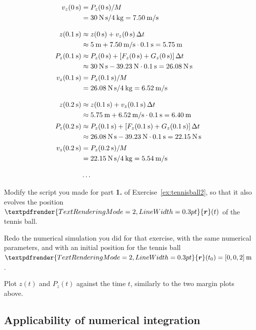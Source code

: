 \documentclass[a4paper,12pt,%
onecolumn,oneside,titlepage,%
british%
]{memoir}
\renewcommand*{\bm}[1]{\textpdfrender{TextRenderingMode=2,LineWidth=0.3pt}{\boldsymbol{#1}}}
\newcommand*{\incr}{\Delta}%
\renewcommand*{\|}[1][]{\nonscript\:#1\vert\nonscript\:\mathopen{}}
\newcommand*{\yr}{\bm{r}}
\newcommand*{\yM}{M}%
\newcommand*{\Dt}{\incr t}
\begin{document}
\begin{equation*}
  \begin{aligned}
    v_{z}(\qty{0}{s}) &= P_{z}(\qty{0}{s})/\yM\\
    &=\qty{30}{N\,s}/\qty{4}{kg} = \qty{7.50}{m/s}
    \\[3\jot]
    z(\qty{0.1}{s})  &\approx z(\qty{0}{s}) + v_{z}(\qty{0}{s})\,\Dt\\
    &\approx \qty{5}{m} + \qty{7.50}{m/s}\cdot\qty{0.1}{s} = \qty{5.75}{m}\\[0.5\jot]
    P_{z}(\qty{0.1}{s})  &\approx P_{z}(\qty{0}{s}) + [F_{z}(\qty{0}{s}) + G_{z}(\qty{0}{s})]\,\Dt \\
    &\approx\qty{30}{N\,s} -\qty{39.23}{N}\cdot\qty{0.1}{s} = \qty{26.08}{N\,s} \\[0.5\jot]
    v_{z}(\qty{0.1}{s}) &= P_{z}(\qty{0.1}{s})/\yM\\
    &=\qty{26.08}{N\,s}/\qty{4}{kg} = \qty{6.52}{m/s}
    \\[3\jot]
    z(\qty{0.2}{s})  &\approx z(\qty{0.1}{s}) + v_{z}(\qty{0.1}{s})\,\Dt\\
    &\approx \qty{5.75}{m} + \qty{6.52}{m/s}\cdot\qty{0.1}{s} = \qty{6.40}{m}\\[0.5\jot]
    P_{z}(\qty{0.2}{s})  &\approx P_{z}(\qty{0.1}{s}) + [F_{z}(\qty{0.1}{s}) + G_{z}(\qty{0.1}{s})]\,\Dt\\
    &\approx\qty{26.08}{N\,s} -\qty{39.23}{N}\cdot\qty{0.1}{s} = \qty{22.15}{N\,s} \\[0.5\jot]
    v_{z}(\qty{0.2}{s}) &= P_{z}(\qty{0.2}{s})/\yM\\
    &=\qty{22.15}{N\,s}/\qty{4}{kg} = \qty{5.54}{m/s}
    \\[3\jot]
    &\dotso
  \end{aligned}
\end{equation*}

\begin{exercise}[label={ex:tennisball3}]
  Modify the script you made for part \textbf{1.} of Exercise~\ref{ex:tennisball2}, so that it also evolves the position $\yr(t)$ of the tennis ball.

  Redo the numerical simulation you did for that exercise, with the same numerical parameters, and with an initial position for the tennis ball $\yr(t_{0}) = [0,0,2]\:\unit{m}$.

  Plot $z(t)$ and $P_{z}(t)$ against the time $t$, similarly to the two margin plots above.
\end{exercise}

\subsection{Applicability of numerical integration}
\label{sec:applicable_numericintegration}
\end{document}
